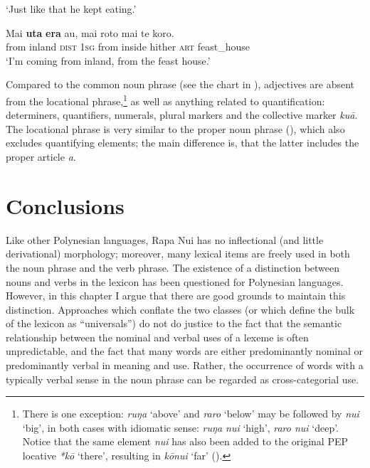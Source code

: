 \glt 
‘Just like that he kept eating.’ \textstyleExampleref{[R310.225]} 
\z

\ea\label{ex:3.181}
\gll Mai \textbf{{\ꞌ}uta} \textbf{era} au, mai roto mai te koro.\\
from inland \textsc{dist} \textsc{1sg} from inside hither \textsc{art} feast\_house\\

\glt
‘I’m coming from inland, from the feast house.’ \textstyleExampleref{[Mtx-7-20.034]}
\z

Compared to the common noun phrase (see the chart in ), adjectives are absent from the locational phrase,\footnote{\label{fn:158}There is one exception: \textit{ruŋa} ‘above’ and \textit{raro} ‘below’ may be followed by \textit{nui} ‘big’, in both cases with idiomatic sense: \textit{ruŋa nui} ‘high’, \textit{raro nui} ‘deep’. Notice that the same element \textit{nui} has also been added to the original PEP locative \textit{*kō} ‘there’, resulting in \textit{kōnui} ‘far’ ().} as well as anything related to quantification: determiners, quantifiers, numerals, plural markers and the collective marker \textit{kuā}. The locational phrase is very similar to the proper noun phrase (), which also excludes quantifying elements; the main difference is, that the latter includes the proper article \textit{a}.
\section{Conclusions}\label{sec:3.7}

Like other Polynesian languages, Rapa Nui has no inflectional (and little derivational) morphology; moreover, many lexical items are freely used in both the noun phrase and the verb phrase. The existence of a distinction between nouns and verbs in the lexicon has been questioned for Polynesian languages. However, in this chapter I argue that there are good grounds to maintain this distinction. Approaches which conflate the two classes (or which define the bulk of the lexicon as “universals”) do not do justice to the fact that the semantic relationship between the nominal and verbal uses of a lexeme is often unpredictable, and the fact that many words are either predominantly nominal or predominantly verbal in meaning and use. Rather, the occurrence of words with a typically verbal sense in the noun phrase can be regarded as cross-categorial use.

